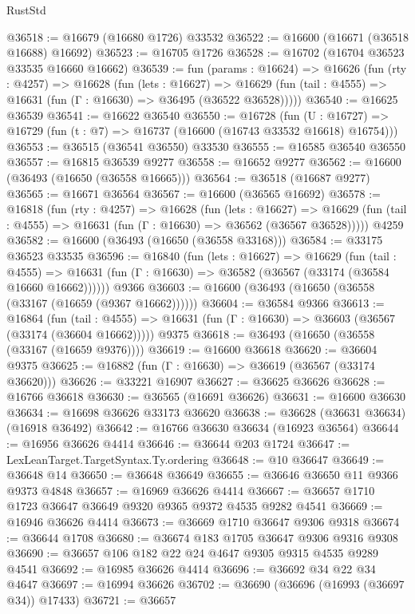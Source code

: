 \begin{lexlean}{RustStd}
\begin{coremodule}
@36518 := @16679 (@16680 @1726) @33532
@36522 := @16600 (@16671 (@36518 @16688) @16692)
@36523 := @16705 @1726
@36528 := @16702 (@16704 @36523 @33535 @16660 @16662)
@36539 := fun (params : @16624) =>
  @16626
    (fun (rty : @4257) =>
    @16628
      (fun (lets : @16627) =>
      @16629 (fun (tail : @4555) => @16631 (fun (Γ : @16630) => @36495 (@36522 @36528)))))
@36540 := @16625 @36539
@36541 := @16622 @36540
@36550 := @16728
    (fun (U : @16727) => @16729 (fun (t : @7) => @16737 (@16600 (@16743 @33532 @16618) @16754)))
@36553 := @36515 (@36541 @36550) @33530
@36555 := @16585 @36540 @36550
@36557 := @16815 @36539 @9277
@36558 := @16652 @9277
@36562 := @16600 (@36493 (@16650 (@36558 @16665)))
@36564 := @36518 (@16687 @9277)
@36565 := @16671 @36564
@36567 := @16600 (@36565 @16692)
@36578 := @16818
    (fun (rty : @4257) =>
    @16628
      (fun (lets : @16627) =>
      @16629 (fun (tail : @4555) => @16631 (fun (Γ : @16630) => @36562 (@36567 @36528)))))
    @4259
@36582 := @16600 (@36493 (@16650 (@36558 @33168)))
@36584 := @33175 @36523 @33535
@36596 := @16840
    (fun (lets : @16627) =>
    @16629
      (fun (tail : @4555) =>
      @16631 (fun (Γ : @16630) => @36582 (@36567 (@33174 (@36584 @16660 @16662))))))
    @9366
@36603 := @16600 (@36493 (@16650 (@36558 (@33167 (@16659 (@9367 @16662))))))
@36604 := @36584 @9366
@36613 := @16864
    (fun (tail : @4555) => @16631 (fun (Γ : @16630) => @36603 (@36567 (@33174 (@36604 @16662)))))
    @9375
@36618 := @36493 (@16650 (@36558 (@33167 (@16659 @9376))))
@36619 := @16600 @36618
@36620 := @36604 @9375
@36625 := @16882 (fun (Γ : @16630) => @36619 (@36567 (@33174 @36620)))
@36626 := @33221 @16907
@36627 := @36625 @36626
@36628 := @16766 @36618
@36630 := @36565 (@16691 @36626)
@36631 := @16600 @36630
@36634 := @16698 @36626 @33173 @36620
@36638 := @36628 (@36631 @36634) (@16918 @36492)
@36642 := @16766 @36630 @36634 (@16923 @36564)
@36644 := @16956 @36626 @4414
@36646 := @36644 @203 @1724
@36647 := LexLeanTarget.TargetSyntax.Ty.ordering
@36648 := @10 @36647
@36649 := @36648 @14
@36650 := @36648 @36649
@36655 := @36646 @36650 @11 @9366 @9373 @4848
@36657 := @16969 @36626 @4414
@36667 := @36657 @1710 @1723 @36647 @36649 @9320 @9365 @9372 @4535 @9282 @4541
@36669 := @16946 @36626 @4414
@36673 := @36669 @1710 @36647 @9306 @9318
@36674 := @36644 @1708
@36680 := @36674 @183 @1705 @36647 @9306 @9316 @9308
@36690 := @36657 @106 @182 @22 @24 @4647 @9305 @9315 @4535 @9289 @4541
@36692 := @16985 @36626 @4414
@36696 := @36692 @34 @22 @34 @4647
@36697 := @16994 @36626
@36702 := @36690 (@36696 (@16993 (@36697 @34)) @17433)
@36721 := @36657

\end{coremodule}
\end{lexlean}
